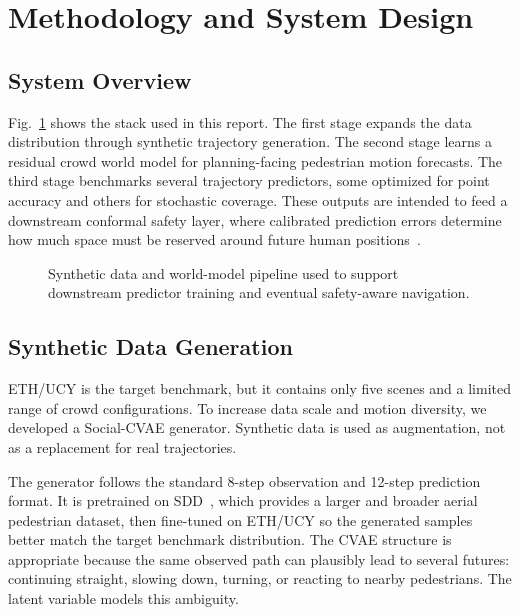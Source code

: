 \documentclass[conference]{IEEEtran}
\begin{document}
\section{Methodology and System Design}

\subsection{System Overview}

Fig.~\ref{fig:system_overview} shows the stack used in this report. The first
stage expands the data distribution through synthetic trajectory generation.
The second stage learns a residual crowd world model for planning-facing
pedestrian motion forecasts. The third stage benchmarks several trajectory
predictors, some optimized for point accuracy and others for stochastic
coverage. These outputs are intended to feed a downstream conformal safety
layer, where calibrated prediction errors determine how much space must be
reserved around future human positions~\cite{angelopoulos2021gentle}.

\begin{figure}[t]
  \centering
  \resizebox{0.70\columnwidth}{!}{}
  \caption{Synthetic data and world-model pipeline used to support downstream
  predictor training and eventual safety-aware navigation.}
  \label{fig:system_overview}
\end{figure}

\subsection{Synthetic Data Generation}

ETH/UCY is the target benchmark, but it contains only five scenes and a limited
range of crowd configurations. To increase data scale and motion diversity, we
developed a Social-CVAE generator. Synthetic data is used as augmentation, not
as a replacement for real trajectories.

The generator follows the standard 8-step observation and 12-step prediction
format. It is pretrained on SDD~\cite{robicquet2016learning}, which provides a
larger and broader aerial pedestrian dataset, then fine-tuned on ETH/UCY so the
generated samples better match the target benchmark distribution. The CVAE
structure is appropriate because the same observed path can plausibly lead to
several futures: continuing straight, slowing down, turning, or reacting to
nearby pedestrians. The latent variable models this ambiguity.
\end{document}
